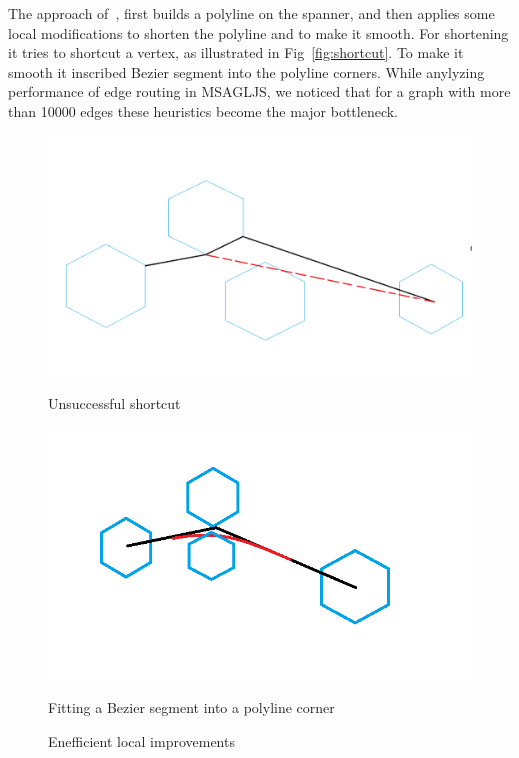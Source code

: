 \documentclass{gd-llncs}
\begin{document}
The approach of~\cite{dwyer2010fast}, first builds a polyline on the spanner, and then applies some local modifications to shorten the polyline and to make it smooth. For shortening it tries to shortcut a vertex, as illustrated in Fig~\ref{fig:shortcut}. To make it smooth it inscribed Bezier segment into the polyline corners. While anylyzing performance of edge routing in MSAGLJS, we noticed that for a graph with more than 10000 edges these heuristics become the major bottleneck. 
\begin{figure}[!tbp]
  \centering
  \begin{minipage}[b]{0.4\textwidth}
    \includegraphics[width=\textwidth]{./naive_shorcut_now_working.png}
    
    \caption{Unsuccessful shortcut}
  \end{minipage}
  \hfill
  \begin{minipage}[b]{0.4\textwidth}
    \includegraphics[width=\textwidth]{fillet_corner.png}
    \caption{Fitting a Bezier segment into a polyline corner}
  \end{minipage}
  \caption*{Enefficient local improvements}  
\end{figure}
\end{document}
